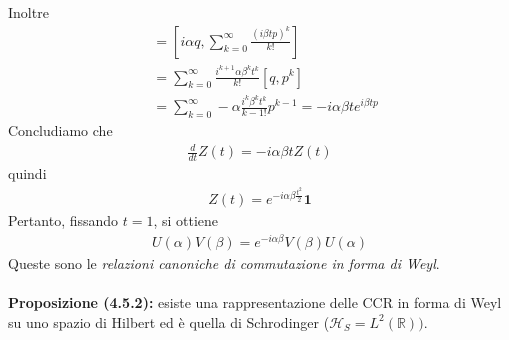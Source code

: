 \documentclass{article}
\numberwithin{equation}{subsection}
\begin{document}
Inoltre
\begin{align*}
    [i\alpha q, e^{i\beta tp}] &= \left[i\alpha q, \sum_{k = 0}^\infty \frac{(i\beta tp)^k}{k!}\right] \\
    &= \sum_{k = 0}^\infty \frac{i^{k + 1}\alpha\beta^kt^k}{k!}[q, p^k] \\
    &= \sum_{k = 0}^\infty -\alpha\frac{i^k\beta^kt^k}{{k - 1}!}p^{k - 1} = -i\alpha\beta t e^{i\beta tp}
\end{align*}
Concludiamo che 
\begin{align*}
    \frac{d}{dt}Z(t) = -i\alpha\beta t Z(t)
\end{align*}
quindi
\begin{align*}
    Z(t) = e^{-i\alpha\beta\frac{t^2}{2}}\mathbf{1}
\end{align*}
Pertanto, fissando $t = 1$, si ottiene
\begin{align*}
    U(\alpha)V(\beta) = e^{-i\alpha\beta}V(\beta)U(\alpha)
\end{align*}
Queste sono le \textit{relazioni canoniche di commutazione in forma di Weyl}. \\ \\
\textbf{Proposizione (4.5.2):} esiste una rappresentazione delle CCR in forma di Weyl su uno spazio di Hilbert ed è quella di Schrodinger ($\mathcal{H}_S = L^2(\mathbb{R}))$. \\
\end{document}
